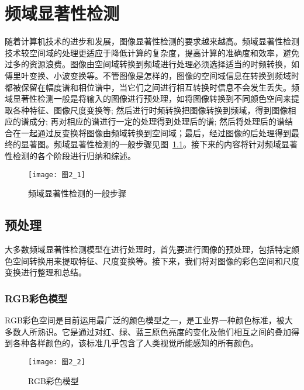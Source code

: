 

\chapter{频域显著性检测}
\label{cha2}

随着计算机技术的进步和发展，图像显著性检测的要求越来越高。频域显著性检测技术较空间域的处理更适应于降低计算的复杂度，提高计算的准确度和效率，避免过多的资源浪费。图像由空间域转换到频域进行处理必须选择适当的时频转换，如傅里叶变换、小波变换等。不管图像是怎样的，图像的空间域信息在转换到频域时都被保留在幅度谱和相位谱中，当它们之间进行相互转换时信息不会发生丢失。频域显著性检测一般是将输入的图像进行预处理，如将图像转换到不同颜色空间来提取各种特征、图像尺度变换等; 然后进行时频转换把图像转换到频域，得到图像相应的谱成分; 再对相应的谱进行一定的处理得到处理后的谱; 然后将处理后的谱结合在一起通过反变换将图像由频域转换到空间域；最后，经过图像的后处理得到最终的显著图。频域显著性检测的一般步骤见图~\ref{图2_1}。接下来的内容将针对频域显著性检测的各个阶段进行归纳和综述。

\begin{figure}[h]
  \centering
  \texttt{[image: 图2\_1]}
  \caption{频域显著性检测的一般步骤}
  \label{图2_1}    
\end{figure}

\section{预处理}
\label{2_1}

大多数频域显著性检测模型在进行处理时，首先要进行图像的预处理，包括特定颜色空间转换用来提取特征、尺度变换等。接下来，我们将对图像的彩色空间和尺度变换进行整理和总结。

\subsection{RGB彩色模型}
\label{2_1_1}

RGB彩色空间是目前运用最广泛的颜色模型之一，是工业界一种颜色标准，被大多数人所熟识。它是通过对红、绿、蓝三原色亮度的变化及他们相互之间的叠加得到各种各样颜色的，该标准几乎包含了人类视觉所能感知的所有颜色。

\begin{figure}[t]
  \centering
  \texttt{[image: 图2\_2]}
  \caption{RGB彩色模型}
  \label{图2_2}    
\end{figure}

